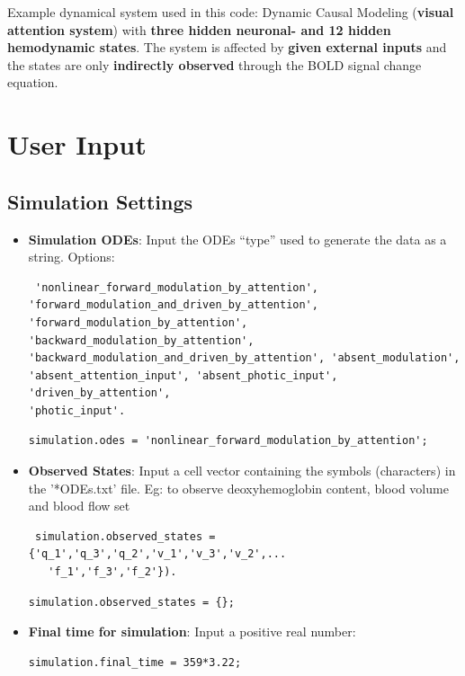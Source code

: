 Example dynamical system used in this code: Dynamic Causal Modeling (\textbf{visual attention system}) with \textbf{three hidden neuronal- and 12 hidden hemodynamic states}. The system is affected by \textbf{given external inputs} and the states are only \textbf{indirectly observed} through the BOLD signal change equation.

\section{User Input}
\subsection{Simulation Settings}
\vspace{1em}
\begin{itemize}
   \item \textbf{Simulation ODEs}: Input the ODEs ``type'' used to generate the data as a string. Options: \begin{verbatim} 'nonlinear_forward_modulation_by_attention',
'forward_modulation_and_driven_by_attention', 
'forward_modulation_by_attention', 'backward_modulation_by_attention', 
'backward_modulation_and_driven_by_attention', 'absent_modulation', 
'absent_attention_input', 'absent_photic_input', 'driven_by_attention', 
'photic_input'.
\end{verbatim} 
    \color{RoyalPurple}\begin{verbatim}
simulation.odes = 'nonlinear_forward_modulation_by_attention';
\end{verbatim} 
\color{black}

   \item \textbf{Observed States}: Input a cell vector containing the symbols (characters) in the '*ODEs.txt' file. Eg: to observe deoxyhemoglobin content, blood volume and blood flow set \begin{verbatim} simulation.observed_states =   {'q_1','q_3','q_2','v_1','v_3','v_2',...
   'f_1','f_3','f_2'}).
\end{verbatim}
    \color{RoyalPurple}\begin{verbatim}
simulation.observed_states = {};
\end{verbatim} 
\color{black}

   \item \textbf{Final time for simulation}: Input a positive real number:
    \color{RoyalPurple}\begin{verbatim}
simulation.final_time = 359*3.22;
\end{verbatim} 
\color{black}


\end{itemize}
